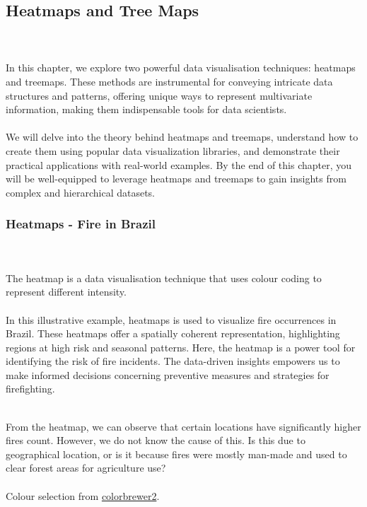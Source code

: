\documentclass{article}\usepackage[]{graphicx}\usepackage[]{xcolor}
\begin{document}
\subsection{Heatmaps and Tree Maps}
\\  
\\In this chapter, we explore two powerful data visualisation techniques: heatmaps and treemaps. These methods are instrumental for conveying intricate data structures and patterns, offering unique ways to represent multivariate information, making them indispensable tools for data scientists.
\\  
\\We will delve into the theory behind heatmaps and treemaps, understand how to create them using popular data visualization libraries, and demonstrate their practical applications with real-world examples. By the end of this chapter, you will be well-equipped to leverage heatmaps and treemaps to gain insights from complex and hierarchical datasets.

\subsubsection{Heatmaps - Fire in Brazil}
\\  
\\The heatmap is a data visualisation technique that uses colour coding to represent different intensity.
\\  
\\In this illustrative example, heatmaps is used to visualize fire occurrences in Brazil. These heatmaps offer a spatially coherent representation, highlighting regions at high risk and seasonal patterns. Here, the heatmap is a power tool for identifying the risk of fire incidents. The data-driven insights empowers us to make informed decisions concerning preventive measures and strategies for firefighting.





\\From the heatmap, we can observe that certain locations have significantly higher fires count. However, we do not know the cause of this. Is this due to geographical location, or is it because fires were mostly man-made and used to clear forest areas for agriculture use?
\\  
\\Colour selection from \href{https://colorbrewer2.org/#type=sequential&scheme=Oranges&n=9}{colorbrewer2}.
\end{document}
